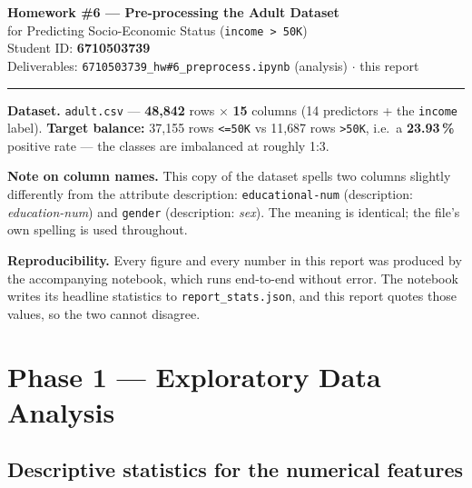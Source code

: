 \documentclass[11pt,a4paper]{article}
\newcommand{\code}[1]{\texttt{\small #1}}
\begin{document}
\begin{center}
  {\LARGE\bfseries\color{hdr} Homework \#6 --- Pre-processing the Adult Dataset}\\[4pt]
  {\large for Predicting Socio-Economic Status (\code{income > 50K})}\\[10pt]
  {\normalsize Student ID: \textbf{6710503739}}\\[2pt]
  {\small Deliverables: \code{6710503739\_hw\#6\_preprocess.ipynb} (analysis)
   $\cdot$ this report}
\end{center}
\vspace{4pt}
\hrule
\vspace{10pt}

\noindent
\textbf{Dataset.} \code{adult.csv} --- \textbf{48{,}842} rows $\times$ \textbf{15} columns
(14 predictors + the \code{income} label). \textbf{Target balance:} 37{,}155 rows
\code{<=50K} vs 11{,}687 rows \code{>50K}, i.e.\ a \textbf{23.93\,\%} positive rate --- the
classes are imbalanced at roughly 1:3.

\medskip
\noindent
\textbf{Note on column names.} This copy of the dataset spells two columns slightly
differently from the attribute description: \code{educational-num} (description:
\emph{education-num}) and \code{gender} (description: \emph{sex}). The meaning is
identical; the file's own spelling is used throughout.

\medskip
\noindent
\textbf{Reproducibility.} Every figure and every number in this report was produced by the
accompanying notebook, which runs end-to-end without error. The notebook writes its
headline statistics to \code{report\_stats.json}, and this report quotes those values, so
the two cannot disagree.

\section{Phase 1 --- Exploratory Data Analysis}

\subsection{Descriptive statistics for the numerical features}
\end{document}
